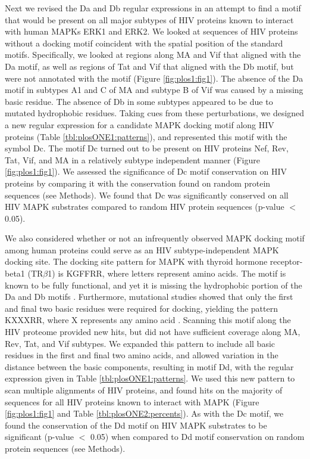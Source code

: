 Next we revised the Da and Db regular expressions in an attempt to
find a motif that would be present on all major subtypes of HIV
proteins known to interact with human MAPKs ERK1 and ERK2. We looked
at sequences of HIV proteins without a docking motif coincident with
the spatial position of the standard motifs. Specifically, we looked
at regions along MA and Vif that aligned with the Da motif, as well as
regions of Tat and Vif that aligned with the Db motif, but were not
annotated with the motif (Figure \ref{fig:plos1:fig1}). The absence of
the Da motif in subtypes A1 and C of MA and subtype B of Vif was
caused by a missing basic residue. The absence of Db in some subtypes
appeared to be due to mutated hydrophobic residues. Taking cues from
these perturbations, we designed a new regular expression for a
candidate MAPK docking motif along HIV proteins (Table
\ref{tbl:plosONE1:patterns}), and represented this motif with the
symbol Dc. The motif Dc turned out to be present on HIV proteins Nef,
Rev, Tat, Vif, and MA in a relatively subtype independent manner
(Figure \ref{fig:plos1:fig1}). We assessed the significance of Dc
motif conservation on HIV proteins by comparing it with the
conservation found on random protein sequences (see Methods). We found
that Dc was significantly conserved on all HIV MAPK substrates
compared to random HIV protein sequences (p-value $<$ 0.05).

We also considered whether or not an infrequently observed MAPK
docking motif among human proteins could serve as an HIV
subtype-independent MAPK docking site. The docking site pattern for
MAPK with thyroid hormone receptor-beta1 (TR$\beta$1) is KGFFRR, where
letters represent amino acids. The motif is known to be fully
functional, and yet it is missing the hydrophobic portion of the Da
and Db motifs \cite{lin03}. Furthermore, mutational studies showed
that only the first and final two basic residues were required for
docking, yielding the pattern KXXXRR, where X represents any amino
acid \cite{lin03}. Scanning this motif along the HIV proteome provided
new hits, but did not have sufficient coverage along MA, Rev, Tat, and
Vif subtypes. We expanded this pattern to include all basic residues
in the first and final two amino acids, and allowed variation in the
distance between the basic components, resulting in motif Dd, with the
regular expression given in Table \ref{tbl:plosONE1:patterns}. We used
this new pattern to scan multiple alignments of HIV proteins, and
found hits on the majority of sequences for all HIV proteins known to
interact with MAPK (Figure \ref{fig:plos1:fig1} and Table
\ref{tbl:plosONE2:percents}). As with the Dc motif, we found the
conservation of the Dd motif on HIV MAPK substrates to be significant
(p-value $<$ 0.05) when compared to Dd motif conservation on random
protein sequences (see Methods).

